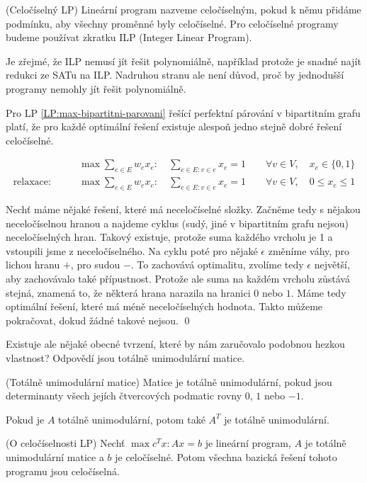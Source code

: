 \label{LP:celociselnost}
\df (Celočíselný LP) Lineární program nazveme celočíselným, pokud k němu přidáme
podmínku, aby všechny proměnné byly celočíselné. Pro celočíselné programy budeme
používat zkratku ILP (Integer Linear Program).

Je zřejmé, že ILP nemusí jít řešit polynomiálně, například protože je snadné
najít redukci ze SATu na ILP. Nadruhou stranu ale není důvod, proč by jednodušší
programy nemohly jít řešit polynomiálně.

\tv Pro LP \eqref{LP:max-bipartitni-parovani} řešící perfektní párování v bipartitním grafu platí, že pro každé
optimální řešení existuje alespoň jedno stejně dobré řešení celočíselné.

\begin{align}
\label{LP:max-bipartitni-parovani}
&\max \sum_{e \in E} w_e x_e: \quad \sum_{e \in E: v \in e} x_e = 1 \qquad\forall v
	\in V, \quad x_e \in \{0, 1\} \\
	\text{relaxace:}\qquad	&\max \sum_{e \in E} w_e x_e: \quad \sum_{e \in E: v \in e} x_e = 1 \qquad\forall v
	\in V, \quad 0 \leq x_e \leq 1
\end{align}

\dk Nechť máme nějaké řešení, které má neceločíselné
složky. Začněme tedy s nějakou neceločíselnou hranou a najdeme cyklus (sudý,
jiné v bipartitním grafu nejsou) neceločíselných hran. Takový existuje, protože
suma každého vrcholu je 1 a vstoupili jsme z neceločíselného. Na cyklu poté pro
nějaké $\epsilon$ změníme váhy, pro lichou hranu $+$, pro sudou $-$. To
zachovává optimalitu, zvolíme tedy $\epsilon$ největší, aby zachovávalo také
přípustnost. Protože ale suma na každém vrcholu zůstává stejná, znamená to, že
některá hrana narazila na hranici $0$ nebo $1$. Máme tedy optimální řešení,
které má méně neceločíselných hodnota. Takto můžeme pokračovat, dokud žádné
takové nejsou. \qed

Existuje ale nějaké obecné tvrzení, které by nám zaručovalo podobnou hezkou
vlastnost? Odpovědí jsou totálně unimodulární matice.

\df (Totálně unimodulární matice) Matice je totálně unimodulární, pokud jsou
determinanty všech jejích čtvercových podmatic rovny $0$, $1$ nebo $-1$.

\poz Pokud je $A$ totálně unimodulární, potom také $A^T$ je totálně
unimodulární.

\vt (O celočíselnosti LP) Nechť $\max c^Tx : Ax = b$ je lineární program, $A$ je totálně
unimodulární matice a $b$ je celočíselné. Potom všechna bazická řešení tohoto
programu jsou celočíselná.

